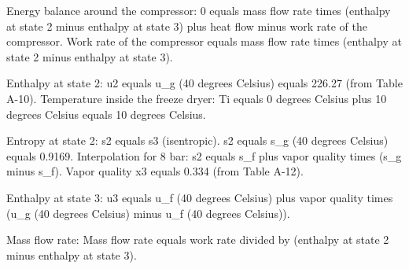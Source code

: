 Energy balance around the compressor:  
0 equals mass flow rate times (enthalpy at state 2 minus enthalpy at state 3) plus heat flow minus work rate of the compressor.  
Work rate of the compressor equals mass flow rate times (enthalpy at state 2 minus enthalpy at state 3).  

Enthalpy at state 2:  
u2 equals u_g (40 degrees Celsius) equals 226.27 (from Table A-10).  
Temperature inside the freeze dryer: Ti equals 0 degrees Celsius plus 10 degrees Celsius equals 10 degrees Celsius.  

Entropy at state 2:  
s2 equals s3 (isentropic).  
s2 equals s_g (40 degrees Celsius) equals 0.9169.  
Interpolation for 8 bar:  
s2 equals s_f plus vapor quality times (s_g minus s_f).  
Vapor quality x3 equals 0.334 (from Table A-12).  

Enthalpy at state 3:  
u3 equals u_f (40 degrees Celsius) plus vapor quality times (u_g (40 degrees Celsius) minus u_f (40 degrees Celsius)).  

Mass flow rate:  
Mass flow rate equals work rate divided by (enthalpy at state 2 minus enthalpy at state 3).